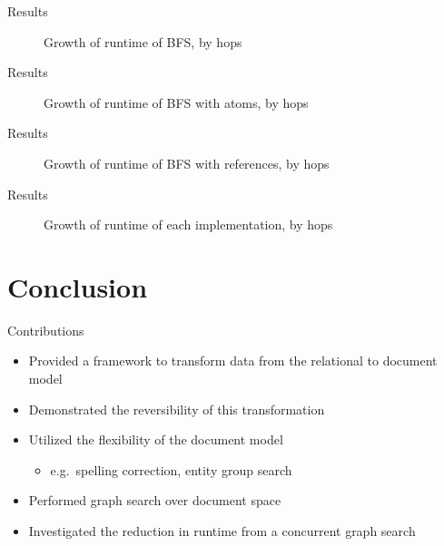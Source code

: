 \documentclass[compress]{beamer}
\begin{document}
		\begin{frame}{Results}
			\begin{figure}
				\centering
				
				\caption{Growth of runtime of BFS, by hops}
			\end{figure}
		\end{frame}
		
		\begin{frame}{Results}
			\begin{figure}
				\centering
				
				\caption{Growth of runtime of BFS with atoms, by hops}
			\end{figure}
		\end{frame}
		
		\begin{frame}{Results}
			\begin{figure}
				\centering
				
				\caption{Growth of runtime of BFS with references, by hops}
			\end{figure}
		\end{frame}
		
		\begin{frame}{Results}
			\begin{figure}
				\centering
				
				\caption{Growth of runtime of each implementation, by hops}
			\end{figure}
		\end{frame}
	
	\section{Conclusion}
		\begin{frame}{Contributions}
			\begin{itemize}
				\item Provided a framework to transform data from the relational to document model
				\item Demonstrated the reversibility of this transformation
				\item Utilized the flexibility of the document model
					\begin{itemize}
						\item e.g.~spelling correction, entity group search
					\end{itemize}
				\item Performed graph search over document space
				\item Investigated the reduction in runtime from a concurrent graph search
			\end{itemize}
		\end{frame}
		
\end{document}
